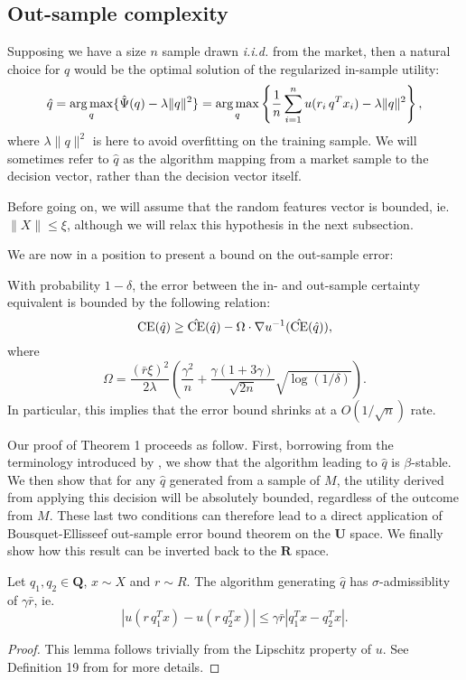 \subsection{Out-sample complexity}

Supposing we have a size $n$ sample drawn \textit{i.i.d.} from the market, then a natural
choice for $q$ would be the optimal solution of the regularized in-sample utility:
\[
  \hat q = \operatorname*{arg\,max}_q\{\hat\Psi(q)-\lambda\|q\|^2\}  = \operatorname*{arg\,max}_q \left\{\frac{1}{n}\sum_{i=1}^n u(r_i\,q^Tx_i) - \lambda\|q\|^2\right\},
\]
where $\lambda\|q\|^2$ is here to avoid overfitting on the training sample. We will
sometimes refer to $\hat q$ as the algorithm mapping from a market sample to the decision
vector, rather than the decision vector itself.

Before going on, we will assume that the random features vector is bounded,
ie. $\|X\|\leq\xi$, although we will relax this hypothesis in the next subsection.

We are now in a position to present a bound on the out-sample error:
\begin{thm}
  With probability $1-\delta$, the error between the in- and out-sample certainty
  equivalent is bounded by the following relation:
  \[
    \operatorname{CE}(\hat q) \geq \hat{\operatorname{CE}}(\hat q) - \Omega\cdot\nabla u^{-1}(\hat{\operatorname{CE}}(\hat q)),
  \]
  where
  \[
    \Omega = \frac{(\bar r\xi)^2}{2\lambda} \left(\frac{\gamma^2}{n} + \frac{\gamma(1+3\gamma)}{\sqrt{2n}}\sqrt{\log(1/\delta)}\right).
  \]
In particular, this implies that the error bound shrinks at a $O(1/\sqrt{n})$ rate. 
\end{thm}

Our proof of Theorem 1 proceeds as follow. First, borrowing from the terminology
introduced by \cite{bousquet2002stability}, we show that the algorithm leading to $\hat q$
is $\beta$-stable. We then show that for any $\hat q$ generated from a sample of $M$, the
utility derived from applying this decision will be absolutely bounded, regardless of the
outcome from $M$. These last two conditions can therefore lead to a direct application of
Bousquet-Ellisseef out-sample error bound theorem on the $\bm U$ space. We finally show how
this result can be inverted back to the $\bm R$ space.

\begin{lemma}
  \label{sigma-adm}
  Let $q_1,q_2\in\bm Q$, $x\sim X$ and $r\sim R$. The algorithm generating $\hat q$ has
  $\sigma$-admissiblity of $\gamma\bar r$, ie.
  \[
    |u(r\,q_1^T x) - u(r\,q_2^T x)| \leq \gamma\bar r|q_1^Tx - q_2^Tx|.
  \]
\end{lemma}
\begin{proof}
  This lemma follows trivially from the Lipschitz property of $u$. See Definition 19 from
  \cite{bousquet2002stability} for more details.
\end{proof}

